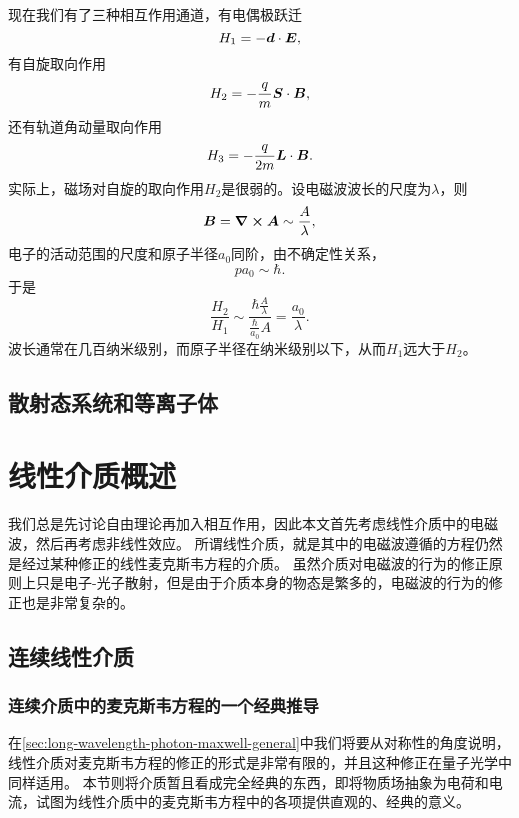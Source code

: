 现在我们有了三种相互作用通道，有电偶极跃迁
\begin{equation}
    H_1 = - \vb*{d} \cdot \vb*{E},
\end{equation}
有自旋取向作用
\begin{equation}
    H_2 = - \frac{q}{m} \vb*{S} \cdot \vb*{B},
\end{equation}
还有轨道角动量取向作用
\begin{equation}
    H_3 = - \frac{q}{2m} \vb*{L} \cdot \vb*{B}.
\end{equation}
实际上，磁场对自旋的取向作用${H}_2$是很弱的。设电磁波波长的尺度为$\lambda$，则
\[
    \vb*{B} = \curl{\vb*{A}} \sim \frac{A}{\lambda},
\]
电子的活动范围的尺度和原子半径$a_0$同阶，由不确定性关系，
\[
    p a_0 \sim \hbar.
\]
于是
\[
    \frac{H_2}{H_1} \sim \frac{\hbar \frac{A}{\lambda}}{\frac{\hbar}{a_0} A} = \frac{a_0}{\lambda}.
\]
波长通常在几百纳米级别，而原子半径在纳米级别以下，从而${H}_1$远大于${H}_2$。

\section{散射态系统和等离子体}

\chapter{线性介质概述}

我们总是先讨论自由理论再加入相互作用，因此本文首先考虑线性介质中的电磁波，然后再考虑非线性效应。
所谓线性介质，就是其中的电磁波遵循的方程仍然是经过某种修正的线性麦克斯韦方程的介质。
虽然介质对电磁波的行为的修正原则上只是电子-光子散射，但是由于介质本身的物态是繁多的，电磁波的行为的修正也是非常复杂的。

\section{连续线性介质}

\subsection{连续介质中的麦克斯韦方程的一个经典推导}\label{sec:classical-continuum}

在\autoref{sec:long-wavelength-photon-maxwell-general}中我们将要从对称性的角度说明，线性介质对麦克斯韦方程的修正的形式是非常有限的，并且这种修正在量子光学中同样适用。
本节则将介质暂且看成完全经典的东西，即将物质场抽象为电荷和电流，试图为线性介质中的麦克斯韦方程中的各项提供直观的、经典的意义。

